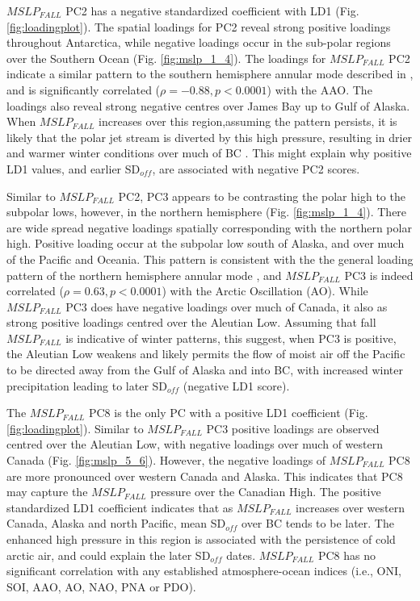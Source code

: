 \documentclass{tATO2e}
\newcommand{\sdoff}{SD$_{off}$}
\begin{document}
$MSLP_{FALL}$ PC2 has a negative standardized coefficient with LD1 (Fig. \ref{fig:loadingplot}). The spatial loadings for PC2 reveal strong positive loadings throughout Antarctica, while negative loadings occur in the sub-polar regions over the Southern Ocean (Fig. \ref{fig:mslp_1_4}). The loadings for $MSLP_{FALL}$ PC2 indicate a similar pattern to the southern hemisphere annular mode described in \cite{Thompson2000}, and is significantly correlated ($\rho = -0.88, p < 0.0001$) with the AAO. The loadings also reveal strong negative centres over James Bay up to Gulf of Alaska. When $MSLP_{FALL}$ increases over this region,assuming the pattern persists, it is likely that the polar jet stream is diverted by this high pressure, resulting in drier and warmer winter conditions over much of BC \citep{Shabbar2006-ek}. This might explain why positive LD1 values, and earlier \sdoff{}, are associated with negative PC2 scores.
\par
Similar to $MSLP_{FALL}$ PC2, PC3 appears to be contrasting the polar high to the subpolar lows, however, in the northern hemisphere (Fig. \ref{fig:mslp_1_4}). There are wide spread negative loadings spatially corresponding with the northern polar high. Positive loading occur at the subpolar low south of Alaska, and over much of the Pacific and Oceania. This pattern is consistent with the the general loading pattern of the northern hemisphere annular mode \citep{Thompson2000}, and $MSLP_{FALL}$ PC3 is indeed correlated ($\rho = 0.63, p < 0.0001$) with the Arctic Oscillation (AO). While $MSLP_{FALL}$ PC3 does have negative loadings over much of Canada, it also as strong positive loadings centred over the Aleutian Low. Assuming that fall $MSLP_{FALL}$ is indicative of winter patterns, this suggest, when PC3 is positive, the Aleutian Low weakens and likely permits the flow of moist air off the Pacific to be directed away from the Gulf of Alaska and into BC, with increased winter precipitation leading to later \sdoff{} (negative LD1 score).   
\par
The $MSLP_{FALL}$ PC8 is the only PC with a positive LD1 coefficient (Fig. \ref{fig:loadingplot}). Similar to $MSLP_{FALL}$ PC3  positive loadings are observed centred over the Aleutian Low, with negative loadings over much of western Canada (Fig. \ref{fig:mslp_5_6}). However, the negative loadings of $MSLP_{FALL}$ PC8 are more pronounced over western Canada and Alaska. This indicates that PC8 may capture the $MSLP_{FALL}$ pressure over the Canadian High. The positive standardized LD1 coefficient indicates that as $MSLP_{FALL}$ increases over western Canada, Alaska and north Pacific, mean \sdoff{} over BC tends to be later. The enhanced high pressure in this region is associated with the persistence of cold arctic air, and could explain the later \sdoff{} dates. $MSLP_{FALL}$ PC8 has no significant correlation with any established atmosphere-ocean indices (i.e., ONI, SOI, AAO, AO, NAO, PNA or PDO). 
\end{document}
